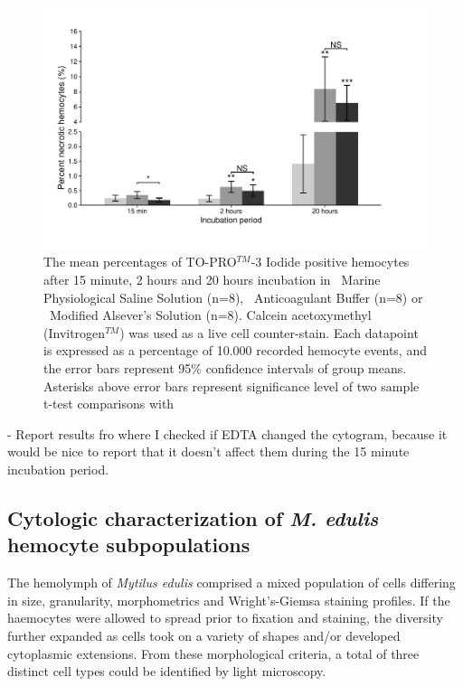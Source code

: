\begin{figure}[!ht]
    \centering
    \includegraphics[width=1.13\textwidth]{figures/Method development/grouped bargraph scaled.pdf}
    \caption{The mean percentages of TO-PRO$^{TM}$-3 Iodide positive hemocytes after 15 minute, 2 hours and 20 hours incubation in \protect\lysegraabox \ Marine Physiological Saline Solution (n=8), \protect\customgraybox \ Anticoagulant Buffer (n=8) or \protect\darkgraybox \ Modified Alsever's Solution (n=8). Calcein acetoxymethyl (Invitrogen$^{TM}$) was used as a live cell counter-stain. Each datapoint is expressed as a percentage of 10.000 recorded hemocyte events, and the error bars represent 95\% confidence intervals of group means. Asterisks above error bars represent significance level of two sample t-test comparisons with }
    \label{fig:BufferViability}
\end{figure}

- Report results fro where I checked if EDTA changed the cytogram, because it would be nice to report that it doesn't affect them during the 15 minute incubation period.

\subsection{Cytologic characterization of \emph{M. edulis} hemocyte subpopulations}
The hemolymph of \emph{Mytilus edulis} comprised a mixed population of cells differing in size, granularity, morphometrics and Wright's-Giemsa staining profiles. If the haemocytes were allowed to spread prior to fixation and staining, the diversity further expanded as cells took on a variety of shapes and/or developed cytoplasmic extensions. From these morphological criteria, a total of three distinct cell types could be identified by light microscopy.

